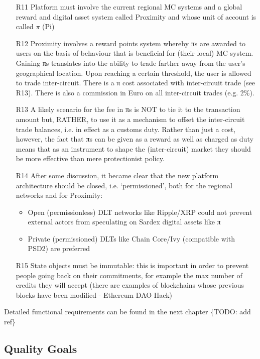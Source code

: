 \begin{itemize}
\item[R11] Platform must involve the current regional MC systems and a global reward and digital asset system called Proximity and whose unit of account is called $\pi $ (Pi)

\item[R12] {Proximity involves a reward points system whereby πs are awarded to users on the basis of behaviour that is beneficial for (their local) MC system. Gaining πs translates into the ability to trade farther away from the user’s geographical location. Upon reaching a certain threshold, the user is allowed to trade inter-circuit. There is a π cost associated with inter-circuit trade (see R13). There is also a commission in Euro on all inter-circuit trades (e.g. 2\%).}

\item[R13] A likely scenario for the fee in πs is NOT to tie it to the transaction amount but, RATHER, to use it as a mechanism to offset the inter-circuit trade balances, i.e. in effect as a customs duty. Rather than just a cost, however, the fact that πs can be given as a reward as well as charged as duty means that as an instrument to shape the (inter-circuit) market they should be more
effective than mere protectionist policy.

\item[R14] After some discussion, it became clear that the new platform architecture should be closed, i.e. ‘permissioned’, both for the regional networks and for Proximity:
\begin{itemize}
	\item Open (permissionless) DLT networks like Ripple/XRP could not prevent external actors
from speculating on Sardex digital assets like π
	\item Private (permissioned) DLTs like Chain Core/Ivy (compatible with PSD2) are preferred
\end{itemize}


\item[R15] State objects must be immutable: this is important in order to prevent people going back on their commitments, for example the max number of credits they will accept (there are examples of blockchains whose previous blocks have been modified - Ethereum DAO Hack)

\end{itemize}

Detailed functional requirements can be found in the next chapter \{TODO: add ref\}

\subsection{Quality Goals}\label{_quality_goals}

